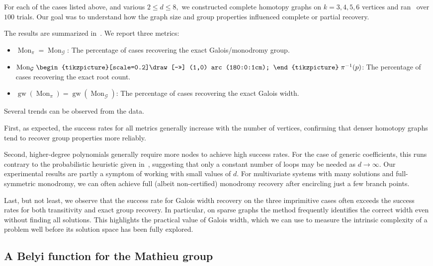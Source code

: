 \documentclass[11pt]{amsart}
\theoremstyle{definition}
\newcommand*\transitive{%
  \mathrel{%
    \begin{tikzpicture}[scale=0.2]%
     \draw[->>] (1,0) arc (180:0:1cm); 
    \end{tikzpicture}%
  }%
}
\theoremstyle{remark}
\DeclareMathOperator{\Mon}{Mon}
\DeclareMathOperator{\gw}{gw}
\begin{document}
For each of the cases listed above, and various $2\le d \le 8,$ we constructed complete homotopy graphs on $k=3,4,5,6$ vertices and ran~ over $100$ trials. Our goal was to understand how the graph size and group properties influenced complete or partial recovery.

The results are summarized in~. We report three metrics:
\begin{itemize}
    \item $\Mon_\pi = \Mon_{\mathcal{G}}$: The percentage of cases recovering the exact Galois/monodromy group.
    \item $\Mon_{\mathcal{G}} \transitive \pi^{-1} (p)$: The percentage of cases recovering the exact root count.
    \item $\gw(\Mon_\pi ) = \gw(\Mon_{\mathcal{G}})$: The percentage of cases recovering the exact Galois width.
\end{itemize}

Several trends can be observed from the data. 

First, as expected, the success rates for all metrics generally increase with the number of vertices, confirming that denser homotopy graphs tend to recover group properties more reliably.

Second, higher-degree polynomials generally require more nodes to achieve high success rates. 
For the case of generic coefficients, this runs contrary to the probabilistic heuristic given in~\cite{duff2019solving}, suggesting that only a constant number of loops may be needed as $d\to \infty.$
Our experimental results are partly a symptom of working with small values of $d.$
For multivariate systems with many solutions and full-symmetric monodromy, we can often achieve full (albeit non-certified) monodromy recovery after encircling just a few branch points.

Last, but not least, we observe that the success rate for Galois width recovery on the three imprimitive cases often exceeds the success rates for both transitivity and exact group recovery.
In particular, on sparse graphs the method frequently identifies the correct width even without finding all solutions. This highlights the practical value of Galois width, which we can use to measure the intrinsic complexity of a problem well before its solution space has been fully explored.


\subsection{A Belyi function for the Mathieu group}\label{subsec:mathieu}
\end{document}
